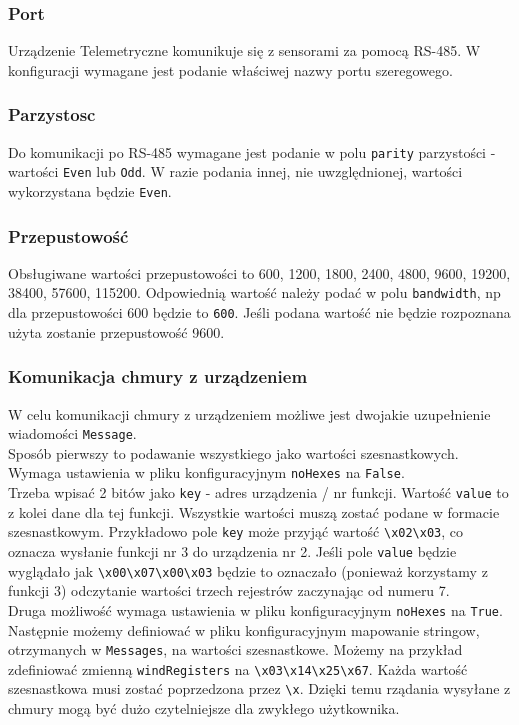 \documentclass[11pt]{article}
\begin{document}
\subsubsection{Port}
Urządzenie Telemetryczne komunikuje się z sensorami za pomocą RS-485. W konfiguracji wymagane
jest podanie właściwej nazwy portu szeregowego.
\subsubsection{Parzystosc}
Do komunikacji po RS-485 wymagane jest podanie w polu \verb|parity| parzystości - wartości \verb|Even| lub \verb|Odd|. W razie podania
innej, nie uwzględnionej, wartości wykorzystana będzie \verb|Even|.
\subsubsection{Przepustowość}
Obsługiwane wartości przepustowości to 600, 1200, 1800, 2400, 4800, 9600, 19200, 38400, 57600, 115200. Odpowiednią wartość
należy podać w polu \verb|bandwidth|, np dla przepustowości 600 będzie to \verb|600|. Jeśli podana wartość nie będzie rozpoznana
użyta zostanie przepustowość 9600.


\subsubsection{Komunikacja chmury z urządzeniem}
W celu komunikacji chmury z urządzeniem możliwe jest dwojakie uzupełnienie wiadomości \verb|Message|.\\
Sposób pierwszy to podawanie wszystkiego jako wartości szesnastkowych. Wymaga ustawienia w pliku konfiguracyjnym \verb|noHexes| na \verb|False|.\\
Trzeba wpisać 2 bitów jako \verb|key| - adres urządzenia / nr funkcji. Wartość \verb|value| to z kolei
dane dla tej funkcji. Wszystkie wartości muszą zostać podane w formacie szesnastkowym.
Przykładowo pole \verb|key| może przyjąć wartość \verb|\x02\x03|, co oznacza wysłanie funkcji nr 3 do urządzenia nr 2. Jeśli pole
\verb|value| będzie wyglądało jak \verb|\x00\x07\x00\x03| będzie to oznaczało (ponieważ korzystamy z funkcji 3) odczytanie wartości
trzech rejestrów zaczynając od numeru 7.\\

Druga możliwość wymaga ustawienia w pliku konfiguracyjnym \verb|noHexes| na \verb|True|.\\
Następnie możemy definiować w pliku konfiguracyjnym mapowanie stringow, otrzymanych w \verb|Messages|, na wartości szesnastkowe.
Możemy na przykład zdefiniować zmienną \verb|windRegisters| na \verb|\x03\x14\x25\x67|. Każda wartość szesnastkowa musi zostać poprzedzona
przez \verb|\x|. Dzięki temu rządania wysyłane z chmury mogą być dużo czytelniejsze dla zwykłego użytkownika.\\
\end{document}
